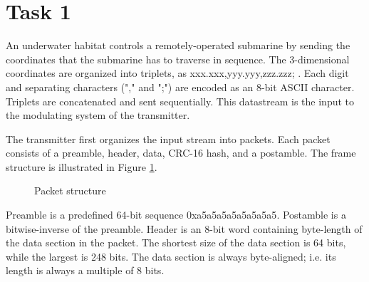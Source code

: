 \documentclass[a4paper]{article}
\begin{document}
\section*{Task 1}
An underwater habitat controls a remotely-operated submarine by sending the coordinates that the submarine has to traverse in sequence. The 3-dimensional coordinates are organized into triplets, as \textsf{xxx.xxx,yyy.yyy,zzz.zzz;} . Each digit and separating characters ("\textsf{,}" and "\textsf{;}") are encoded as an 8-bit ASCII character. Triplets are concatenated and sent sequentially. This datastream is the input to the modulating system of the transmitter.

The transmitter first organizes the input stream into packets. Each packet consists of a preamble, header, data, CRC-16 hash, and a postamble. The frame structure is illustrated in Figure \ref{fig:packet}.

\begin{figure}[h!]
\centering
{}
\caption{Packet structure}
\label{fig:packet}
\end{figure}

Preamble is a predefined 64-bit sequence \textsf{0xa5a5a5a5a5a5a5a5}. Postamble is a bitwise-inverse of the preamble. Header is an 8-bit word containing byte-length of the data section in the packet. The shortest size of the data section is 64 bits, while the largest is 248 bits. The data section is always byte-aligned; i.e. its length is always a multiple of 8 bits.
\end{document}
